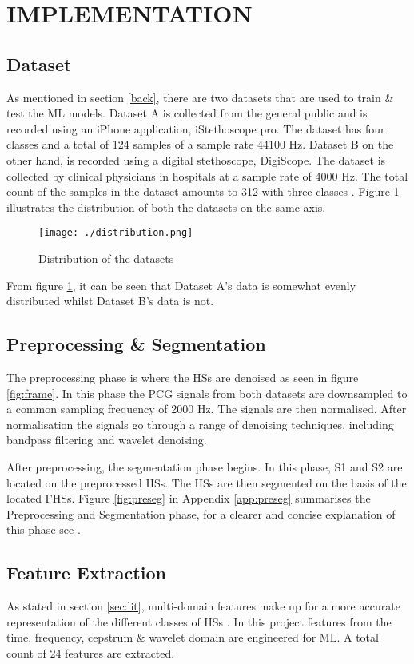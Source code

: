 \documentclass[10pt,twocolumn]{witseiepaper}
\begin{document}
\section{IMPLEMENTATION}
\subsection{Dataset}
As mentioned in section \ref{back}, there are two datasets that are used to train \& test the ML models. Dataset A is collected from the general public and is recorded using an iPhone application, iStethoscope pro. The dataset has four classes and a total of 124 samples of a sample rate 44100 Hz. Dataset B on the other hand, is recorded using a digital stethoscope, DigiScope. The dataset is collected by clinical physicians in hospitals at a sample rate of 4000 Hz. The total count of the samples in the dataset amounts to 312 with three classes \cite{bentley}. Figure \ref{fig:dist} illustrates the distribution of both the datasets on the same axis.

\begin{figure}[h!]
    \centering
    \texttt{[image: ./distribution.png]}
    \caption{Distribution of the datasets}
    \label{fig:dist}
\end{figure}

From figure \ref{fig:dist}, it can be seen that Dataset A's data is somewhat evenly distributed whilst Dataset B's data is not.

\subsection{Preprocessing \& Segmentation}
\label{sec:preseg}
The preprocessing phase is where the HSs are denoised as seen in figure \ref{fig:frame}. In this phase the PCG signals from both datasets are downsampled to a common sampling frequency of 2000 Hz. The signals are then normalised. After normalisation the signals go through a range of denoising techniques, including bandpass filtering and wavelet denoising. 

After preprocessing, the segmentation phase begins. In this phase, S1 and S2 are located on the preprocessed HSs. The HSs are then segmented on the basis of the located FHSs. Figure \ref{fig:preseg} in Appendix \ref{app:preseg} summarises the Preprocessing and Segmentation phase, for a clearer and concise explanation of this phase see \cite{love}.

\subsection{Feature Extraction}
As stated in section \ref{sec:lit}, multi-domain features make up for a more accurate representation of the different classes of HSs \cite{22,44}. In this project features from the time, frequency, cepstrum \& wavelet domain are engineered for ML. A total count of 24 features are extracted.
\end{document}
